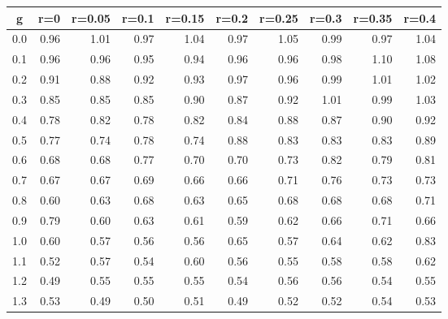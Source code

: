 %
\begin{table}[!tbp]
 \begin{center}
 \begin{tabular}{rrrrrrrrrr}\hline\hline
\multicolumn{1}{c}{g}&\multicolumn{1}{c}{r=0}&\multicolumn{1}{c}{r=0.05}&\multicolumn{1}{c}{r=0.1}&\multicolumn{1}{c}{r=0.15}&\multicolumn{1}{c}{r=0.2}&\multicolumn{1}{c}{r=0.25}&\multicolumn{1}{c}{r=0.3}&\multicolumn{1}{c}{r=0.35}&\multicolumn{1}{c}{r=0.4}\tabularnewline
\hline
0.0&0.96&1.01&0.97&1.04&0.97&1.05&0.99&0.97&1.04\tabularnewline
0.1&0.96&0.96&0.95&0.94&0.96&0.96&0.98&1.10&1.08\tabularnewline
0.2&0.91&0.88&0.92&0.93&0.97&0.96&0.99&1.01&1.02\tabularnewline
0.3&0.85&0.85&0.85&0.90&0.87&0.92&1.01&0.99&1.03\tabularnewline
0.4&0.78&0.82&0.78&0.82&0.84&0.88&0.87&0.90&0.92\tabularnewline
0.5&0.77&0.74&0.78&0.74&0.88&0.83&0.83&0.83&0.89\tabularnewline
0.6&0.68&0.68&0.77&0.70&0.70&0.73&0.82&0.79&0.81\tabularnewline
0.7&0.67&0.67&0.69&0.66&0.66&0.71&0.76&0.73&0.73\tabularnewline
0.8&0.60&0.63&0.68&0.63&0.65&0.68&0.68&0.68&0.71\tabularnewline
0.9&0.79&0.60&0.63&0.61&0.59&0.62&0.66&0.71&0.66\tabularnewline
1.0&0.60&0.57&0.56&0.56&0.65&0.57&0.64&0.62&0.83\tabularnewline
1.1&0.52&0.57&0.54&0.60&0.56&0.55&0.58&0.58&0.62\tabularnewline
1.2&0.49&0.55&0.55&0.55&0.54&0.56&0.56&0.54&0.55\tabularnewline
1.3&0.53&0.49&0.50&0.51&0.49&0.52&0.52&0.54&0.53\tabularnewline
\hline
\end{tabular}

\end{center}

\end{table}

